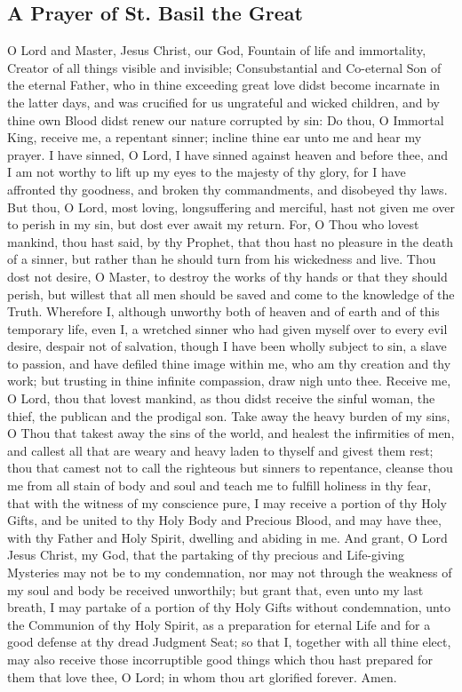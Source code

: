 \subsection{A Prayer of St. Basil the Great}

    O Lord and Master, Jesus Christ, our God, Fountain of life and immortality, Creator of all things visible and invisible; Consubstantial and Co-eternal Son of the eternal Father, who in thine exceeding great love didst become incarnate in the latter days, and was crucified for us ungrateful and wicked children, and by thine own Blood didst renew our nature corrupted by sin: Do thou, O Immortal King, receive me, a repentant sinner; incline thine ear unto me and hear my prayer. I have sinned, O Lord, I have sinned against heaven and before thee, and I am not worthy to lift up my eyes to the majesty of thy glory, for I have affronted thy goodness, and broken thy commandments, and disobeyed thy laws. But thou, O Lord, most loving, longsuffering and merciful, hast not given me over to perish in my sin, but dost ever await my return. For, O Thou who lovest mankind, thou hast said, by thy Prophet, that thou hast no pleasure in the death of a sinner, but rather than he should turn from his wickedness and live. Thou dost not desire, O Master, to destroy the works of thy hands or that they should perish, but willest that all men should be saved and come to the knowledge of the Truth. Wherefore I, although unworthy both of heaven and of earth and of this temporary life, even I, a wretched sinner who had given myself over to every evil desire, despair not of salvation, though I have been wholly subject to sin, a slave to passion, and have defiled thine image within me, who am thy creation and thy work; but trusting in thine infinite compassion, draw nigh unto thee. Receive me, O Lord, thou that lovest mankind, as thou didst receive the sinful woman, the thief, the publican and the prodigal son. Take away the heavy burden of my sins, O Thou that takest away the sins of the world, and healest the infirmities of men, and callest all that are weary and heavy laden to thyself and givest them rest; thou that camest not to call the righteous but sinners to repentance, cleanse thou me from all stain of body and soul and teach me to fulfill holiness in thy fear, that with the witness of my conscience pure, I may receive a portion of thy Holy Gifts, and be united to thy Holy Body and Precious Blood, and may have thee, with thy Father and Holy Spirit, dwelling and abiding in me. And grant, O Lord Jesus Christ, my God, that the partaking of thy precious and Life-giving Mysteries may not be to my condemnation, nor may not through the weakness of my soul and body be received unworthily; but grant that, even unto my last breath, I may partake of a portion of thy Holy Gifts without condemnation, unto the Communion of thy Holy Spirit, as a preparation for eternal Life and for a good defense at thy dread Judgment Seat; so that I, together with all thine elect, may also receive those incorruptible good things which thou hast prepared for them that love thee, O Lord; in whom thou art glorified forever. Amen.

